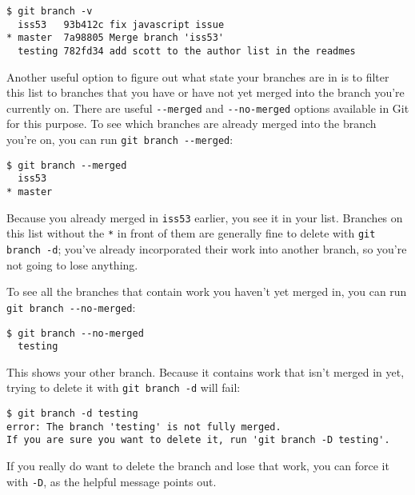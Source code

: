 \documentclass[a4paper]{book}
\begin{document}
\begin{shaded}\begin{verbatim}
$ git branch -v
  iss53   93b412c fix javascript issue
* master  7a98805 Merge branch 'iss53'
  testing 782fd34 add scott to the author list in the readmes
\end{verbatim}\end{shaded}

Another useful option to figure out what state your branches are in is to filter this list to branches that you have or have not yet merged into the branch you're currently on. There are useful \texttt{-{}-merged} and \texttt{-{}-no-merged} options available in Git for this purpose. To see which branches are already merged into the branch you're on, you can run \texttt{git branch -{}-merged}:

\begin{shaded}\begin{verbatim}
$ git branch --merged
  iss53
* master
\end{verbatim}\end{shaded}

Because you already merged in \texttt{iss53} earlier, you see it in your list. Branches on this list without the \texttt{*} in front of them are generally fine to delete with \texttt{git branch -d}; you've already incorporated their work into another branch, so you're not going to lose anything.

To see all the branches that contain work you haven't yet merged in, you can run \texttt{git branch -{}-no-merged}:

\begin{shaded}\begin{verbatim}
$ git branch --no-merged
  testing
\end{verbatim}\end{shaded}

This shows your other branch. Because it contains work that isn't merged in yet, trying to delete it with \texttt{git branch -d} will fail:

\begin{shaded}\begin{verbatim}
$ git branch -d testing
error: The branch 'testing' is not fully merged.
If you are sure you want to delete it, run 'git branch -D testing'.
\end{verbatim}\end{shaded}

If you really do want to delete the branch and lose that work, you can force it with \texttt{-D}, as the helpful message points out.
\end{document}
